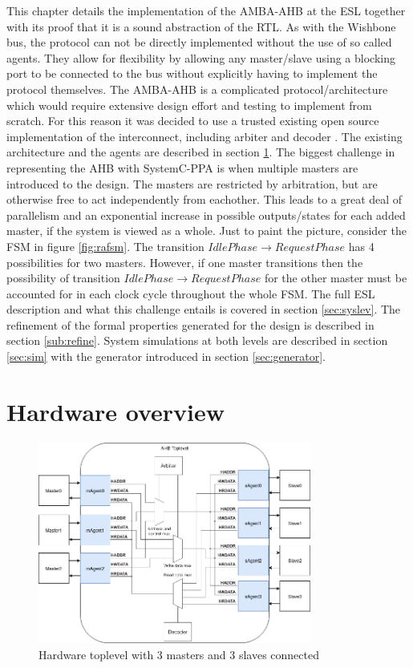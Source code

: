 \label{ch:impl}
This chapter details the implementation of the AMBA-AHB at the ESL together with its proof that it is a sound abstraction of the RTL. As with the Wishbone bus, the protocol can not be directly implemented without the use of so called agents. They allow for flexibility by allowing any master/slave using a blocking port to be connected to the bus without explicitly having to implement the protocol themselves. The AMBA-AHB is a complicated protocol/architecture which would require extensive design effort and testing to implement from scratch. For this reason it was decided to use a trusted existing open source implementation of the interconnect, including arbiter and decoder \cite{ahbsys}. The existing architecture and the agents are described in section \ref{sec:hardover}. The biggest challenge in representing the AHB with SystemC-PPA is when multiple masters are introduced to the design. The masters are restricted by arbitration, but are otherwise free to act independently from eachother. This leads to a great deal of parallelism and an exponential increase in possible outputs/states for each added master, if the system is viewed as a whole. Just to paint the picture, consider the FSM in figure \ref{fig:rafsm}. The transition $Idle Phase\rightarrow Request Phase$ has 4 possibilities for two masters. However, if one master transitions then the possibility of transition $Idle Phase\rightarrow Request Phase$ for the other master must be accounted for in each clock cycle throughout the whole FSM. The full ESL description and what this challenge entails is covered in section \ref{sec:syslev}. The refinement of the formal properties generated for the design is described in section \ref{sub:refine}. System simulations at both levels are described in section \ref{sec:sim} with the generator introduced in section \ref{sec:generator}.

\newpage
\section{Hardware overview}
\label{sec:hardover}
\begin{figure}[hbt]
    \begin{center}
        \includegraphics[width=0.8\textwidth]{figs/hw/Hw_toplevel.png}
    \end{center}
    \caption{Hardware toplevel with 3 masters and 3 slaves connected}
    \label{fig:hw_toplev}
\end{figure}

